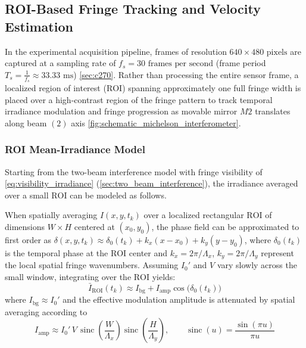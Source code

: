 \subsection{ROI-Based Fringe Tracking and Velocity Estimation}
\label{sec:roi_fringe_velocity}

In the experimental acquisition pipeline, frames of resolution $640 \times 480\text{ pixels}$ are captured at a sampling rate of $f_s = 30\text{ frames per second}$ (frame period $T_s = \frac{1}{f_s} \approx 33.33\text{ ms}$) \cref{sec:c270}. Rather than processing the entire sensor frame, a localized region of interest ($\text{ROI}$) spanning approximately one full fringe width is placed over a high-contrast region of the fringe pattern to track temporal irradiance modulation and fringe progression as movable mirror $M2$ translates along beam $(2)$ axis \cref{fig:schematic_michelson_interferometer}.



\subsubsection{ROI Mean-Irradiance Model}
\label{sec:roi_model_validity}

Starting from the two-beam interference model with fringe visibility of \cref{eq:visibility_irradiance} (\cref{sec:two_beam_interference}), the irradiance averaged over a small $\text{ROI}$ can be modeled as follows.

When spatially averaging $I(x, y, t_k)$ over a localized rectangular $\text{ROI}$ of dimensions $W \times H$ centered at $(x_0, y_0)$, the phase field can be approximated to first order as $\delta(x, y, t_k) \approx \delta_0(t_k) + k_x(x - x_0) + k_y(y - y_0)$, where $\delta_0(t_k)$ is the temporal phase at the $\text{ROI}$ center and $k_x = 2\pi/\Lambda_x$, $k_y = 2\pi/\Lambda_y$ represent the local spatial fringe wavenumbers. Assuming $I_0'$ and $V$ vary slowly across the small window, integrating over the $\text{ROI}$ yields:
\begin{equation}
    \bar{I}_{\text{ROI}}(t_k) \approx I_{\text{bg}} + I_{\text{amp}}\cos\!\bigl(\delta_0(t_k)\bigr)
    \label{eq:roi_irradiance_model_justified}
\end{equation}
where $I_{\text{bg}} \approx I_0'$ and the effective modulation amplitude is attenuated by spatial averaging according to
\begin{equation}
    I_{\text{amp}} \approx I_0'\,V\,\operatorname{sinc}\!\left(\frac{W}{\Lambda_x}\right)\operatorname{sinc}\!\left(\frac{H}{\Lambda_y}\right), \qquad \operatorname{sinc}(u) = \frac{\sin(\pi u)}{\pi u}
    \label{eq:roi_sinc_attenuation}
\end{equation}

